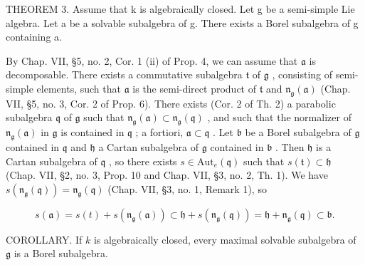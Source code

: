 THEOREM 3. Assume that k is algebraically closed. Let g be a semi-simple Lie algebra. Let a be a solvable subalgebra of g. There exists a Borel subalgebra of g containing a.

By Chap. VII, §5, no. 2, Cor. 1 (ii) of Prop. 4, we can assume that \(\mathfrak{a}\) is decomposable. There exists a commutative subalgebra \(\mathfrak{t}\) of \(\mathfrak{g}\) , consisting of semi-simple elements, such that \(\mathfrak{a}\) is the semi-direct product of \(\mathfrak{t}\) and \(\mathfrak{n}_{\mathfrak{g}}(\mathfrak{a})\) (Chap. VII, §5, no. 3, Cor. 2 of Prop. 6). There exists (Cor. 2 of Th. 2) a parabolic subalgebra \(\mathfrak{q}\) of \(\mathfrak{g}\) such that \(\mathfrak{n}_{\mathfrak{g}}(\mathfrak{a}) \subset \mathfrak{n}_{\mathfrak{g}}(\mathfrak{q})\) , and such that the normalizer of \(\mathfrak{n}_{\mathfrak{g}}(\mathfrak{a})\) in \(\mathfrak{g}\) is contained in \(\mathfrak{q}\) ; a fortiori, \(\mathfrak{a} \subset \mathfrak{q}\) . Let \(\mathfrak{b}\) be a Borel subalgebra of \(\mathfrak{g}\) contained in \(\mathfrak{q}\) and \(\mathfrak{h}\) a Cartan subalgebra of \(\mathfrak{g}\) contained in \(\mathfrak{b}\) . Then \(\mathfrak{h}\) is a Cartan subalgebra of \(\mathfrak{q}\) , so there exists \(s \in \mathrm{Aut}_e(\mathfrak{q})\) such that \(s(\mathfrak{t}) \subset \mathfrak{h}\) (Chap. VII, §2, no. 3, Prop. 10 and Chap. VII, §3, no. 2, Th. 1). We have \(s(\mathfrak{n}_{\mathfrak{g}}(\mathfrak{q})) = \mathfrak{n}_{\mathfrak{g}}(\mathfrak{q})\) (Chap. VII, §3, no. 1, Remark 1), so

\[
s (\mathfrak {a}) = s (t) + s \left(\mathfrak {n} _ {\mathfrak {g}} (\mathfrak {a})\right) \subset \mathfrak {h} + s \left(\mathfrak {n} _ {\mathfrak {g}} (\mathfrak {q})\right) = \mathfrak {h} + \mathfrak {n} _ {\mathfrak {g}} (\mathfrak {q}) \subset \mathfrak {b}.
\]

COROLLARY. If \(k\) is algebraically closed, every maximal solvable subalgebra of \(\mathfrak{g}\) is a Borel subalgebra.

